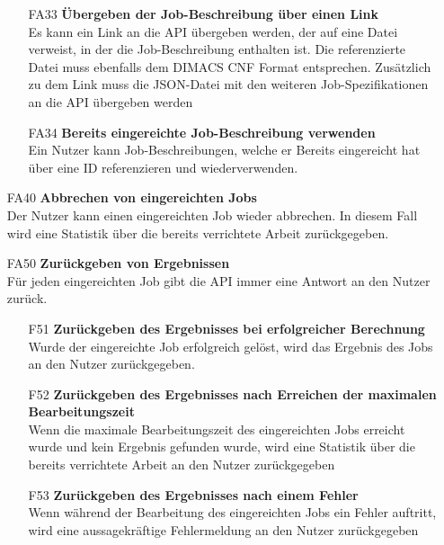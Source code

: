 \begin{itemize}
\begin{itemize}
        \item[FA33] \textbf{Übergeben der Job-Beschreibung über einen Link} \\
        Es kann ein Link an die API übergeben werden, der auf eine Datei verweist, in der die Job-Beschreibung enthalten ist. Die referenzierte Datei muss ebenfalls dem DIMACS CNF Format entsprechen. Zusätzlich zu dem Link muss die JSON-Datei mit den weiteren Job-Spezifikationen an die API übergeben werden
        
        \item[FA34] \textbf{Bereits eingereichte Job-Beschreibung verwenden}\\
        Ein Nutzer kann Job-Beschreibungen, welche er Bereits eingereicht hat über eine ID referenzieren und wiederverwenden.
        
    \end{itemize}
    
    \item[FA40] \textbf{Abbrechen von eingereichten Jobs} \\
    Der Nutzer kann einen eingereichten Job wieder abbrechen. In diesem Fall wird eine Statistik über die bereits verrichtete Arbeit zurückgegeben.
    
    \item[FA50] \textbf{Zurückgeben von Ergebnissen} \\
    Für jeden eingereichten Job gibt die API immer eine Antwort an den Nutzer zurück. 
    
    \begin{itemize}
        \item[F51] \textbf{Zurückgeben des Ergebnisses bei erfolgreicher Berechnung} \\
        Wurde der eingereichte Job erfolgreich gelöst, wird das Ergebnis des Jobs an den Nutzer zurückgegeben.
        
        \item[F52] \textbf{Zurückgeben des Ergebnisses nach Erreichen der maximalen Bearbeitungszeit} \\
        Wenn die maximale Bearbeitungszeit des eingereichten Jobs erreicht wurde und kein Ergebnis gefunden wurde, wird eine Statistik über die bereits verrichtete Arbeit an den Nutzer zurückgegeben
        
        \item[F53] \textbf{Zurückgeben des Ergebnisses nach einem Fehler} \\
        Wenn während der Bearbeitung des eingereichten Jobs ein Fehler auftritt, wird eine aussagekräftige Fehlermeldung an den Nutzer zurückgegeben
        

\end{itemize}
\end{itemize}
